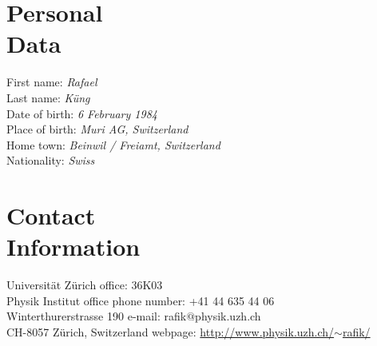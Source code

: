 \documentclass[margin,line]{resume}
\begin{document}
\begin{resume}

\section{\mysidestyle Personal\\Data}

First name:           \emph{Rafael}\\
Last name:            \emph{Küng}\\
Date of birth:        \emph{6 February 1984}\\
Place of birth:       \emph{Muri AG, Switzerland}\\
Home town:            \emph{Beinwil / Freiamt, Switzerland}\\
Nationality:          \emph{Swiss}

\section{\mysidestyle Contact\\Information}

Universität Zürich                \hfill office: 36K03                              \\%
Physik Institut                   \hfill office phone number: +41 44 635 44 06      \\%
Winterthurerstrasse 190           \hfill e-mail: rafik$@$physik.uzh.ch              \\%
CH-8057 Z\"urich, Switzerland     \hfill webpage:
                                        \href{http://www.physik.uzh.ch/~rafik/}{http://www.physik.uzh.ch/$\sim$rafik/}




\end{resume}
\end{document}
